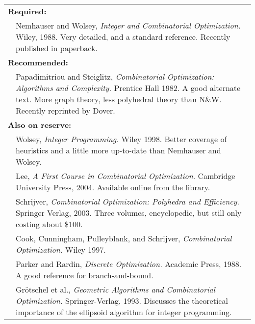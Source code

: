 \documentclass{article}
\begin{document}
\begin{tabular}{l@{\hspace{.2in}}p{5.8in}}
   \multicolumn{2}{l}{\bf Required:}  \\
    \quad     &  Nemhauser and Wolsey, {\em Integer and Combinatorial
                    Optimization.}  Wiley, 1988.
                    Very detailed, and a standard reference.
                    Recently published in paperback.  \\
   \multicolumn{2}{l}{\bf Recommended:}  \\
    \quad     &   Papadimitriou and Steiglitz,  {\em Combinatorial
                    Optimization:
                    Algorithms and Complexity.}   Prentice Hall 1982.
                    A good alternate text.  More graph theory, less
                    polyhedral theory than N\&W.
                    Recently reprinted by Dover.   \\
   \multicolumn{2}{l}{\bf Also on reserve:}  \\
    \quad     &  Wolsey,  {\em Integer Programming.}  Wiley 1998.
                    Better coverage of heuristics and a little more
                    up-to-date than Nemhauser and Wolsey.
                    \\
   \quad     & Lee, {\em A First Course in Combinatorial Optimization}.
                    Cambridge University Press, 2004.
                    Available online from the library.  \\
   \quad     & Schrijver, {\em Combinatorial Optimization: Polyhedra and Efficiency}.
                    Springer Verlag, 2003. Three volumes, encyclopedic,
                    but still only costing about \$100.  \\
   \quad      &   Cook, Cunningham, Pulleyblank, and Schrijver,
                    {\em Combinatorial Optimization.}  Wiley 1997.
                    \\
   \quad      &   Parker and Rardin, {\em Discrete
                    Optimization.}  Academic Press,
                    1988.  A good reference for branch-and-bound.  \\
   \quad      &   Gr\"{o}tschel et al., {\em Geometric Algorithms and
                    Combinatorial Optimization.}
                    Springer-Verlag, 1993.
                    Discusses the theoretical importance of the
                    ellipsoid algorithm for integer programming.  \\

\end{tabular}
\end{document}
